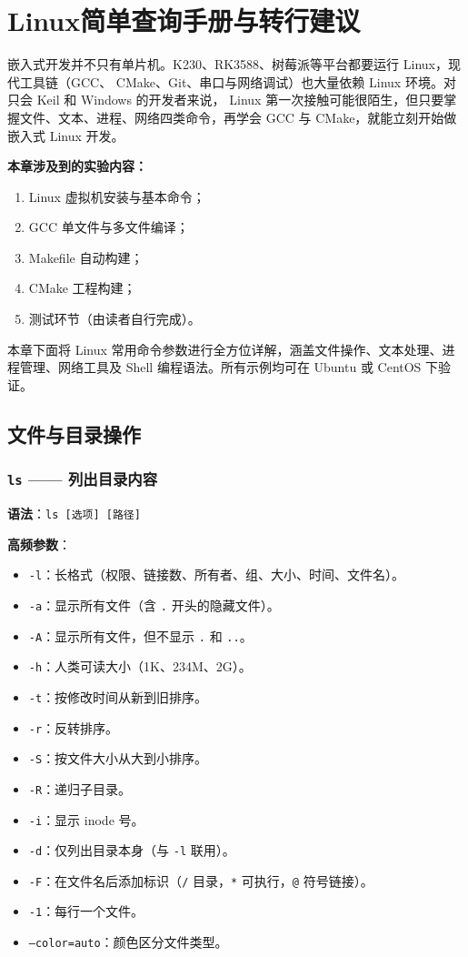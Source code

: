 \chapter{Linux简单查询手册与转行建议} \label{ch:linux}

嵌入式开发并不只有单片机。K230、RK3588、树莓派等平台都要运行 Linux，现代工具链（GCC、 CMake、Git、串口与网络调试）也大量依赖 Linux 环境。对只会 Keil 和 Windows 的开发者来说， Linux 第一次接触可能很陌生，但只要掌握文件、文本、进程、网络四类命令，再学会 GCC 与 CMake，就能立刻开始做嵌入式 Linux 开发。

\medskip \textbf{本章涉及到的实验内容：}
\begin{enumerate}
\item Linux 虚拟机安装与基本命令；
\item GCC 单文件与多文件编译；
\item Makefile 自动构建；
\item CMake 工程构建；
\item 测试环节（由读者自行完成）。
\end{enumerate}

本章下面将 Linux 常用命令参数进行全方位详解，涵盖文件操作、文本处理、进程管理、网络工具及 Shell 编程语法。所有示例均可在 Ubuntu 或 CentOS 下验证。

\section{文件与目录操作}

\subsection{\texttt{ls} —— 列出目录内容} \textbf{语法}：\texttt{ls [选项] [路径]}

\textbf{高频参数}：
\begin{itemize}
\item \texttt{-l}：长格式（权限、链接数、所有者、组、大小、时间、文件名）。
\item \texttt{-a}：显示所有文件（含 \texttt{.} 开头的隐藏文件）。
\item \texttt{-A}：显示所有文件，但不显示 \texttt{.} 和 \texttt{..}。
\item \texttt{-h}：人类可读大小（1K、234M、2G）。
\item \texttt{-t}：按修改时间从新到旧排序。
\item \texttt{-r}：反转排序。
\item \texttt{-S}：按文件大小从大到小排序。
\item \texttt{-R}：递归子目录。
\item \texttt{-i}：显示 inode 号。
\item \texttt{-d}：仅列出目录本身（与 \texttt{-l} 联用）。
\item \texttt{-F}：在文件名后添加标识（\texttt{/} 目录，\texttt{*} 可执行，\texttt{@} 符号链接）。
\item \texttt{-1}：每行一个文件。
\item \texttt{--color=auto}：颜色区分文件类型。
\end{itemize}

